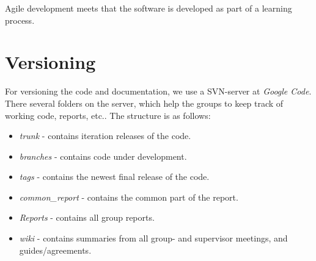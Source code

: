 Agile development meets that the software is developed as part of a learning process.

\section{Versioning}
For versioning the code and documentation, we use a SVN-server at \textit{Google Code}\cite{web:googlecode}.\\

There several folders on the server, which help the groups to keep track of working code, reports, etc.. The structure is as follows:
	\begin{itemize}
		\item \textit{trunk} - contains iteration releases of the code.
		\item \textit{branches} - contains code under development.
		\item \textit{tags} - contains the newest final release of the code.
		\item \textit{common\_report} - contains the common part of the report.
		\item \textit{Reports} - contains all group reports.
		\item \textit{wiki} - contains summaries from all group- and supervisor meetings, and guides/agreements.
	\end{itemize}